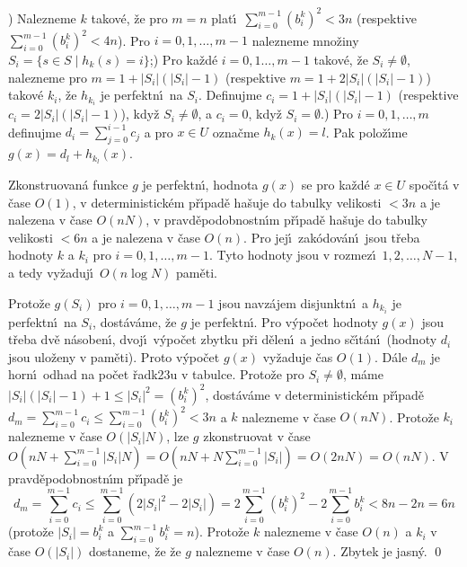 ) Nalezneme $k$ takov\'e, \v ze pro $m=n$ plat\'\i\ 
$\sum_{i=0}^{m-1}(b_i^k)^2<3n$ (respektive $\sum_{i=0}^{m-1}(b_i^
k)^2<4n$).  Pro 
$i=0,1,\dots,m-1$ nalezneme mno\v ziny 
$S_i=\{s\in S\mid h_k(s)=i\}$;) Pro ka\v zd\'e $i=0,1\dots,m-1$ takov\'e, \v ze $S_i\ne\emptyset$, 
nalezneme pro $m=1+|S_i|(|S_i|-1)$ (respektive $m=1+2|S_i|(|S_i|-
1)$) 
takov\'e $k_i$, \v ze $h_{k_i}$ je perfektn\'\i\ na $S_i$. Definujme 
$c_i=1+|S_i|(|S_i|-1)$ (respektive $c_i=2|S_i|(|S_i|-1)$), kdy\v z 
$S_i\ne\emptyset$, a $c_i=0$, kdy\v z 
$S_i=\emptyset$.) Pro $i=0,1,\dots,m$ definujme $d_i=\sum_{j=0}^{i-1}c_j$ a pro $
x\in U$ 
ozna\v cme $h_k(x)=l$. Pak polo\v z\'\i me $g(x)=d_l+h_{k_l}(x)$.

Zkonstruovan\'a funkce $g$ je perfektn\'\i , 
hodnota $g(x)$ se pro ka\v zd\'e $x\in U$ spo\v c\'\i t\'a v \v case $
O(1)$, 
v deterministick\'em p\v r\'\i pa\-d\v e ha\v suje do tabulky velikosti 
$<3n$ a je nalezena v \v case $O(nN)$, v pravd\v epodobnostn\'\i m 
p\v r\'\i pa\-d\v e ha\v suje do tabulky velikosti $<6n$ a je nalezena 
v \v case $O(n)$. Pro jej\'\i\ zak\'odov\'an\'\i\ jsou t\v reba hodnoty $
k$ a 
$k_i$ pro $i=0,1,\dots,m-1$. Tyto hodnoty jsou v rozmez\'\i\ 
$1,2,\dots,N-1$, a tedy vy\v zaduj\'\i\ $O(n\log N)$ pam\v eti.
\endproclaim

Proto\v ze $g(S_i)$ pro $i=0,1,\dots,m-1$ 
jsou navz\'ajem disjunktn\'\i\ a $h_{k_i}$ je perfektn\'\i\ na $S_
i$, 
dost\'av\'ame, \v ze $g$ je perfektn\'\i . Pro v\'ypo\v cet hodnoty $
g(x)$ 
jsou t\v reba dv\v e n\'asoben\'\i , dvoj\'\i\ v\'ypo\v cet zbytku p\v ri 
d\v elen\'\i\ a jedno s\v c\'\i t\'an\'\i\ (hodnoty $d_i$ jsou ulo\v zeny v 
pam\v eti). Proto v\'ypo\v cet $g(x)$ vy\v zaduje \v cas $O(1)$. D\'ale 
$d_m$ je horn\'\i\ odhad na po\v cet \v radk\accent23u v tabulce. 
Proto\v ze pro $S_i\ne\emptyset$, m\'ame $|S_i|(|S_i|-1)+1\le |S_
i|^2=(b_i^k)^2$, 
dost\'av\'ame v deterministick\'em p\v r\'\i pad\v e 
$d_m=\sum_{i=0}^{m-1}c_i\le\sum_{i=0}^{m-1}(b_i^k)^2<3n$ a $k$ nalezneme v \v case 
$O(nN)$. Proto\v ze $k_i$ nalezneme v \v case $O(|S_i|N)$, lze $g$ 
zkonstruovat v \v case 
$O(nN+\sum_{i=0}^{m-1}|S_i|N)=O(nN+N\sum_{i=0}^{m-1}|S_i|)=O(2nN)
=O(nN)$. 
V pravd\v epodob\-nostn\'\i m p\v r\'\i pad\v e je 
$$d_m=\sum_{i=0}^{m-1}c_i\le\sum_{i=0}^{m-1}(2|S_i|^2-2|S_
i|)=2\sum_{i=0}^{m-1}(b_i^k)^2-2\sum_{i=0}^{m-1}b_i^k<8n-2n=6n$$
(proto\v ze $|S_i|=b_i^k$ a $\sum_{i=0}^{m-1}b_i^k=n$). Proto\v ze $
k$ nalezneme v \v case $O(n)$ a $k_i$ v \v case $O(|S_i|)$ dostaneme, \v ze 
\v ze $g$ nalezneme v \v case $O(n)$. Zbytek je jasn\'y. \qed
\enddemo

